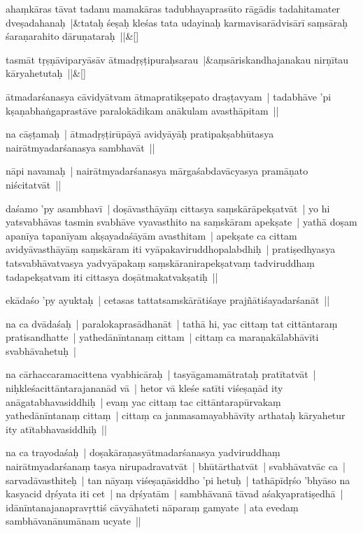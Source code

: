 \documentclass[article,12pt,a4paper]{memoir}
\begin{document}
	    
	    \stanza[\smallbreak]
	ahaṃkāras tāvat tadanu mamakāras tadubhayaprasūto rāgādis tadahitamater dveṣadahanaḥ |&tataḥ śeṣaḥ kleśas tata udayinaḥ karmavisarādvisārī saṃsāraḥ śaraṇarahito dāruṇataraḥ ||\&[\smallbreak]


	
	    
	    \stanza[\smallbreak]
	tasmāt tṛṣṇāviparyāsāv ātmadṛṣṭipuraḥsarau |&aṃsāriskandhajanakau nirṇītau kāryahetutaḥ ||\&[\smallbreak]


	

	  \pstart ātmadarśanasya cāvidyātvam ātmapratikṣepato draṣṭavyam | tadabhāve 'pi kṣaṇabhaṅgaprastāve paralokādikam anākulam avasthāpitam || 
	\pend
      

	  \pstart na cāṣṭamaḥ | ātmadṛṣṭirūpāyā avidyāyāḥ pratipakṣabhūtasya nairātmyadarśanasya sambhavāt || 
	\pend
      

	  \pstart nāpi navamaḥ | nairātmyadarśanasya mārgaśabdavācyasya pramāṇato niścitatvāt || 
	\pend
      

	  \pstart daśamo 'py asambhavī | doṣāvasthāyāṃ cittasya saṃskārāpekṣatvāt | yo hi yatsvabhāvas tasmin svabhāve vyavasthito na saṃskāram apekṣate | yathā doṣam apanīya tapanīyam akṣayadaśāyām avasthitam | apekṣate ca cittam avidyāvasthāyāṃ saṃskāram iti vyāpakaviruddhopalabdhiḥ | pratiṣedhyasya tatsvabhāvatvasya yadvyāpakaṃ saṃskāranirapekṣatvaṃ tadviruddhaṃ tadapekṣatvam iti cittasya doṣātmakatvakṣatiḥ || 
	\pend
      

	  \pstart ekādaśo 'py ayuktaḥ | cetasas tattatsamskārātiśaye prajñātiśayadarśanāt || 
	\pend
      

	  \pstart na ca dvādaśaḥ | paralokaprasādhanāt | tathā hi, yac cittaṃ tat cittāntaraṃ pratisandhatte | yathedānīntanaṃ cittam | cittaṃ ca maraṇakālabhāvīti svabhāvahetuḥ | 
	\pend
      

	  \pstart na cārhaccaramacittena vyabhicāraḥ | tasyāgamamātrataḥ pratītatvāt | niḥkleśacittāntarajananād vā | hetor vā kleśe satīti viśeṣaṇād ity anāgatabhavasiddhiḥ | evaṃ yac cittaṃ tac cittāntarapūrvakaṃ yathedānīntanaṃ cittaṃ | cittaṃ ca janmasamayabhāvīty arthataḥ kāryahetur ity atītabhavasiddhiḥ || 
	\pend
      

	  \pstart na ca trayodaśaḥ | doṣakāraṇasyātmadarśanasya yadviruddhaṃ nairātmyadarśanaṃ tasya nirupadravatvāt | bhūtārthatvāt | svabhāvatvāc ca | sarvadāvasthiteḥ | tan nāyaṃ viśeṣaṇāsiddho 'pi hetuḥ | tathāpīdṛśo 'bhyāso na kasyacid dṛśyata iti cet | na dṛśyatām | sambhāvanā tāvad aśakyapratiṣedhā | idānīntanajanapravṛttiś cāvyāhateti nāparaṃ gamyate | ata evedaṃ sambhāvanānumānam ucyate || 
	\pend
      
\end{document}

